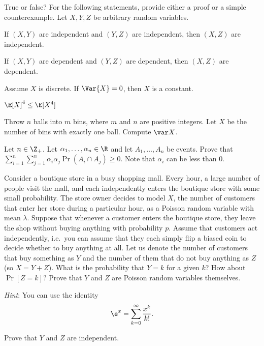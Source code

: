 
True or false?
For the following statements, provide either a proof or a simple counterexample.
Let $X, Y, Z$ be arbitrary random variables.
\begin{Parts}
        \Part If $(X, Y)$ are independent and $(Y, Z)$ are independent, then
        $(X, Z)$ are independent.

        \Part If $(X, Y)$ are dependent and $(Y, Z)$ are dependent, then
        $(X, Z)$ are dependent.

        
        \Part Assume $X$ is discrete.
        If $\Var{X} = 0$, then $X$ is a constant.

        \Part $\E[X]^4 \leq \E[X^4]$
\end{Parts}


Throw $n$ balls into $m$ bins, where $m$ and $n$ are positive integers. Let $X$ be the number of bins with exactly one ball. Compute $\var X$.



Let $n \in \Z_+$.
Let $\alpha_1, \dotsc, \alpha_n \in \R$ and let $A_1, \dotsc, A_n$ be events.
Prove that $\sum_{i=1}^n \sum_{j=1}^n \alpha_i \alpha_j \Pr(A_i \cap A_j) \ge 0$. Note that $\alpha_i$ can be less than $0$.
\nosolspace{5cm}



\begin{Parts}
    \Part Consider a boutique store in a busy shopping mall. Every hour, a large number of people visit the mall, and each independently enters the boutique store with some small probability. The store owner decides to model $X$, the number of customers that enter her store during a particular hour, as a Poisson random variable with mean $\lambda$.
    Suppose that whenever a customer enters the boutique store, they leave the shop without buying anything with probability $p$. Assume that customers act independently, i.e.~you can assume that they each simply flip a biased coin to decide whether to buy anything at all. Let us denote the number of customers that buy something as $Y$ and the number of them that do not buy anything as $Z$ (so $X = Y+Z$). 
    What is the probability that $Y=k$ for a given $k$? How about $\Pr[Z=k]$? Prove that $Y$ and $Z$ are Poisson random variables themselves.

    \textit{Hint}: You can use the identity
    \begin{align*}
        \e^x=\sum_{k=0}^{\infty}\frac{x^k}{k!}.
    \end{align*}

    \Part Prove that $Y$ and $Z$ are independent.
\end{Parts}


